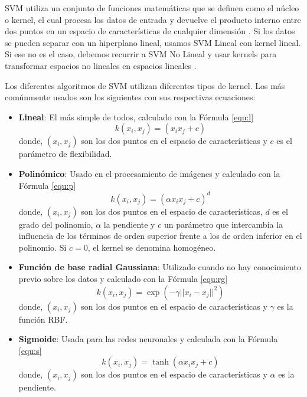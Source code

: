 \begin{itemize}
\gls{SVM} utiliza un conjunto de funciones matemáticas que se definen como el núcleo o kernel, el cual procesa los datos de entrada y devuelve el producto interno entre dos puntos en un espacio de características de cualquier dimensión \cite{147}. Si los datos se pueden separar con un hiperplano lineal, usamos \gls{SVM} Lineal con kernel lineal. Si ese no es el caso, debemos recurrir a \gls{SVM} No Lineal y usar kernels para transformar espacios no lineales en espacios lineales \cite{148}.

Los diferentes algoritmos de \gls{SVM} utilizan diferentes tipos de kernel. Los más comúnmente usados son los siguientes con sus respectivas ecuaciones: 

\begin{itemize}
    \item \textbf{Lineal}: El más simple de todos, calculado con la Fórmula \ref{equ:l} \cite{150}
    \begin{equation}\label{equ:l}
    k(x_i,x_j) = (x_ix_j+c)
    \end{equation}
    \noindent donde, $(x_i,x_j)$ son los dos puntos en el espacio de características y $c$ es el parámetro de flexibilidad.
    
    \item \textbf{Polinómico}: Usado en el procesamiento de imágenes y calculado con la Fórmula \ref{equ:p} \cite{149}
    \begin{equation}\label{equ:p}
    k(x_i,x_j) = (\alpha x_ix_j+c)^d
    \end{equation}
    \noindent donde, $(x_i,x_j)$ son los dos puntos en el espacio de características, $d$ es el grado del polinomio, $\alpha$ la pendiente y $c$ un parámetro que intercambia la influencia de los términos de orden superior frente a los de orden inferior en el polinomio. Si $c = 0$, el kernel se denomina homogéneo.
    
    \item \textbf{Función de base radial Gaussiana}: Utilizado cuando no hay conocimiento previo sobre los datos y calculado con la Fórmula \ref{equ:rg} \cite{147}
    \begin{equation}\label{equ:rg}
    k(x_i,x_j) = \exp(-\gamma \vert\vert x_i-x_j \vert\vert^2)
    \end{equation}
    \noindent donde, $(x_i,x_j)$ son los dos puntos en el espacio de características y $\gamma$ es la función \gls{RBF}.
    
    \item \textbf{Sigmoide}: Usada para las redes neuronales y calculada con la Fórmula \ref{equ:s} \cite{150}
    \begin{equation}\label{equ:s}
    k(x_i,x_j) = \tanh(\alpha x_ix_j + c)
    \end{equation}
    \noindent donde, $(x_i,x_j)$ son los dos puntos en el espacio de características y $\alpha$ es la pendiente.
\end{itemize}



\end{itemize}
